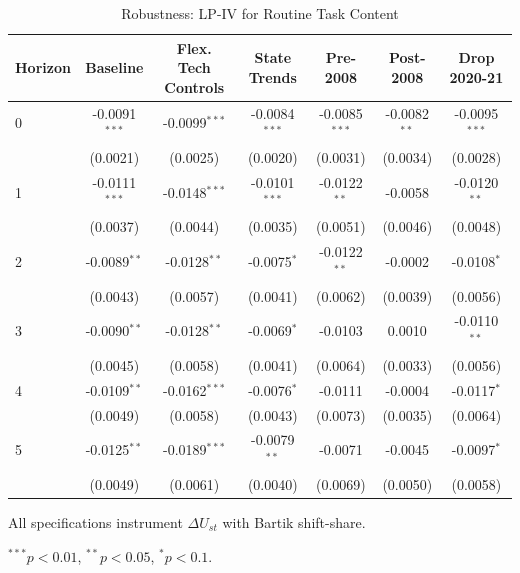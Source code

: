 \begin{table}[htbp]
\centering
\caption{Robustness: LP-IV for Routine Task Content}
\label{tab:robustness}
\small
\begin{tabular}{lcccccc}
\hline\hline
Horizon & Baseline & Flex. Tech Controls & State Trends & Pre-2008 & Post-2008 & Drop 2020-21 \\
\hline
0 & -0.0091$^{***}$ & -0.0099$^{***}$ & -0.0084$^{***}$ & -0.0085$^{***}$ & -0.0082$^{**}$ & -0.0095$^{***}$ \\
 & (0.0021) & (0.0025) & (0.0020) & (0.0031) & (0.0034) & (0.0028) \\[3pt]
1 & -0.0111$^{***}$ & -0.0148$^{***}$ & -0.0101$^{***}$ & -0.0122$^{**}$ & -0.0058 & -0.0120$^{**}$ \\
 & (0.0037) & (0.0044) & (0.0035) & (0.0051) & (0.0046) & (0.0048) \\[3pt]
2 & -0.0089$^{**}$ & -0.0128$^{**}$ & -0.0075$^{*}$ & -0.0122$^{**}$ & -0.0002 & -0.0108$^{*}$ \\
 & (0.0043) & (0.0057) & (0.0041) & (0.0062) & (0.0039) & (0.0056) \\[3pt]
3 & -0.0090$^{**}$ & -0.0128$^{**}$ & -0.0069$^{*}$ & -0.0103 & 0.0010 & -0.0110$^{**}$ \\
 & (0.0045) & (0.0058) & (0.0041) & (0.0064) & (0.0033) & (0.0056) \\[3pt]
4 & -0.0109$^{**}$ & -0.0162$^{***}$ & -0.0076$^{*}$ & -0.0111 & -0.0004 & -0.0117$^{*}$ \\
 & (0.0049) & (0.0058) & (0.0043) & (0.0073) & (0.0035) & (0.0064) \\[3pt]
5 & -0.0125$^{**}$ & -0.0189$^{***}$ & -0.0079$^{**}$ & -0.0071 & -0.0045 & -0.0097$^{*}$ \\
 & (0.0049) & (0.0061) & (0.0040) & (0.0069) & (0.0050) & (0.0058) \\[3pt]
\hline\hline
\end{tabular}
\begin{tablenotes}\small
\item All specifications instrument $\Delta U_{st}$ with Bartik shift-share.
\item $^{***}p<0.01$, $^{**}p<0.05$, $^{*}p<0.1$.
\end{tablenotes}
\end{table}